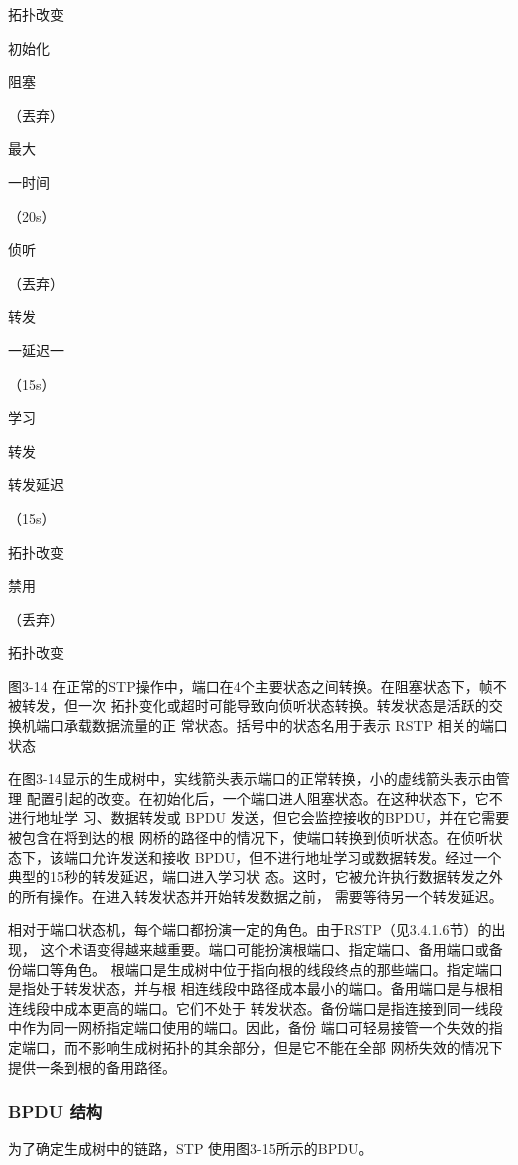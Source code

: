 拓扑改变

初始化

阻塞

（丟弃）

最大

一时间

（20s）

侦听

（丟弃）

转发

一延迟一

（15s）

学习

转发

转发延迟

（15s）

拓扑改变

禁用

（丢弃）

拓扑改变

图3-14
在正常的STP操作中，端口在4个主要状态之间转换。在阻塞状态下，帧不被转发，但一次
拓扑变化或超时可能导致向侦听状态转换。转发状态是活跃的交换机端口承载数据流量的正
常状态。括号中的状态名用于表示 RSTP 相关的端口状态

在图3-14显示的生成树中，实线箭头表示端口的正常转换，小的虚线箭头表示由管理
配置引起的改变。在初始化后，一个端口进人阻塞状态。在这种状态下，它不进行地址学
习、数据转发或 BPDU 发送，但它会监控接收的BPDU，并在它需要被包含在将到达的根
网桥的路径中的情况下，使端口转换到侦听状态。在侦听状态下，该端口允许发送和接收
BPDU，但不进行地址学习或数据转发。经过一个典型的15秒的转发延迟，端口进入学习状
态。这时，它被允许执行数据转发之外的所有操作。在进入转发状态并开始转发数据之前，
需要等待另一个转发延迟。

相对于端口状态机，每个端口都扮演一定的角色。由于RSTP（见3.4.1.6节）的出现，
这个术语变得越来越重要。端口可能扮演根端口、指定端口、备用端口或备份端口等角色。
根端口是生成树中位于指向根的线段终点的那些端口。指定端口是指处于转发状态，并与根
相连线段中路径成本最小的端口。备用端口是与根相连线段中成本更高的端口。它们不处于
转发状态。备份端口是指连接到同一线段中作为同一网桥指定端口使用的端口。因此，备份
端口可轻易接管一个失效的指定端口，而不影响生成树拓扑的其余部分，但是它不能在全部
网桥失效的情况下提供一条到根的备用路径。

\subsubsection{ BPDU 结构}

为了确定生成树中的链路，STP 使用图3-15所示的BPDU。

